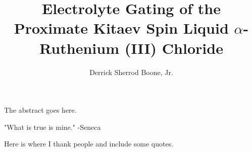 \documentclass[12pt]{report}
\title{Electrolyte Gating of the Proximate Kitaev Spin Liquid $\alpha$-Ruthenium (III) Chloride}
\author{Derrick Sherrod Boone, Jr.}
\begin{document}

    \beforepreface


        The abstract goes here.

\newpage

"What is true is mine." -Seneca

        Here is where I thank people and include some quotes.

    \afterpreface
 
 













\end{document}
